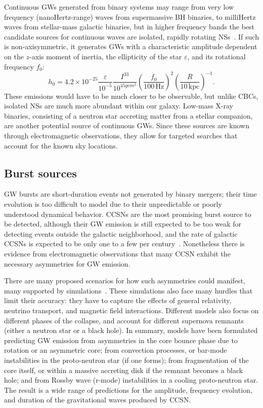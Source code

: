 Continuous \acp{GW} generated from binary systems may range from very low frequency (nanoHertz-range) waves from supermassive \ac{BH} binaries, to milliHertz waves from stellar-mass galactic binaries, but in higher frequency bands the best candidate sources for continuous waves are isolated, rapidly rotating \acp{NS}~\citep{Riles_2017}.
If such  is non-axisymmetric, it generates \acp{GW} with a characteristic amplitude dependent on the $z$-axis moment of inertia, the ellipticity of the star $\varepsilon$,  and its rotational frequency $f_0$:
\begin{equation}
	h_0 = 4.2 \times 10^{-25} \frac{\varepsilon}{10^{-5}} \frac{I^{33}}{10^{45 g cm^2}} \left( \frac{f_0}{100\,\mathrm{Hz}} \right)^2 \left( \frac{R}{10\,\mathrm{kpc}} \right)^{-1}.
\end{equation}
These emissions would have to be much closer to be observable, but unlike \acp{CBC}, isolated \acp{NS} are much more abundant within our galaxy.
Low-mass X-ray binaries, consisting of a neutron star accreting matter from a stellar companion, are another potential source of continuous \acp{GW}.
Since these sources are known through electromagnetic observations, they allow for targeted searches that account for the known sky locations.


\subsection{Burst sources}

GW bursts are short-duration events not generated by binary mergers; their time evolution is too difficult to model due to their unpredictable or poorly understood dynamical behavior.
\acp{CCSN} are the most promising burst source to be detected, although their \ac{GW} emission is still expected to be too weak for detecting events outside the galactic neighborhood, and the rate of galactic \acp{CCSN} is expected to be only one to a few per century~\citep{Adams_2013, Maoz_2010}.
Nonetheless there is evidence from electromagnetic observations that many CCSN exhibit the necessary asymmetries for GW emission.

There are many proposed scenarios for how such asymmetries could manifest, many supported by simulations~\citep{Fryer_2011, Fryer_2002}.
These simulations also face many hurdles that limit their accuracy: they have to capture the effects of general relativity, neutrino transport, and magnetic field interactions.
Different models also focus on different phases of the collapse, and account for different supernova remnants (either a neutron star or a black hole).
In summary, models have been formulated predicting GW emission from asymmetries in the core bounce phase due to rotation or an asymmetric core; from convection processes, or bar-mode instabilities in the proto-neutron star (if one forms); from fragmentation of the core itself, or within a massive accreting disk if the remnant becomes a black hole; and from Rossby wave (r-mode) instabilities in a cooling proto-neutron star.
The result is a wide range of predictions for the amplitude, frequency evolution, and duration of the gravitational waves produced by CCSN.



